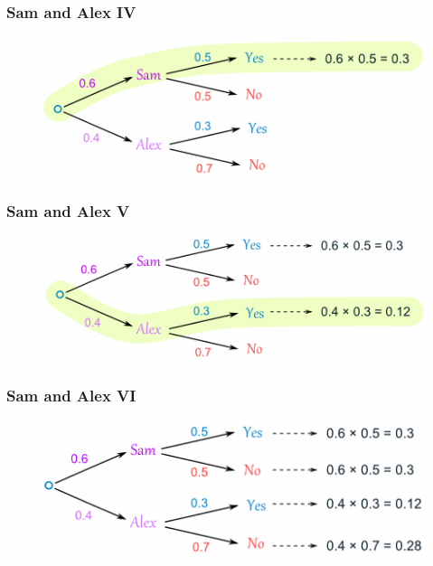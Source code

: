 \documentclass[xcolor=dvipsnames]{beamer}
\begin{document}
\begin{frame}
  \frametitle{Sam and Alex IV}
\begin{figure}[h]
\includegraphics[scale=\sam]{./diagrams/sam4.png}
\end{figure}
\end{frame}

\begin{frame}
  \frametitle{Sam and Alex V}
\begin{figure}[h]
\includegraphics[scale=\sam]{./diagrams/sam5.png}
\end{figure}
\end{frame}

\begin{frame}
  \frametitle{Sam and Alex VI}
\begin{figure}[h]
\includegraphics[scale=\sam]{./diagrams/sam6.png}
\end{figure}
\end{frame}
\end{document}
